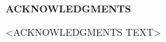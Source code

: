 \begin{center}
    {\fontsize{18pt}{0pt} \MakeUppercase{\textbf{acknowledgments}}}
\vspace*{24pt}
\end{center}


<ACKNOWLEDGMENTS TEXT>
